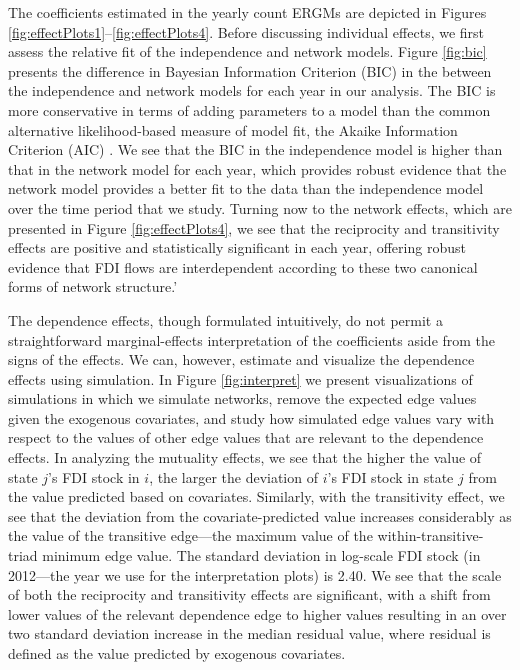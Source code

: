 \documentclass{article}
\begin{document}
The coefficients estimated in the yearly count ERGMs are depicted in Figures \ref{fig:effectPlots1}--\ref{fig:effectPlots4}. Before discussing individual effects, we first assess the relative fit of the independence and network models. Figure \ref{fig:bic} presents the difference in Bayesian Information Criterion (BIC) in the between the independence and network models for each year in our analysis. The BIC is more conservative in terms of adding parameters to a model than the common alternative likelihood-based measure of model fit, the Akaike Information Criterion (AIC) \citep{waldorp2005model,abrahamowicz1990optimal,raftery1999bayes}. We see that the BIC in the independence model is higher than that in the network model for each year, which provides robust evidence that the network model provides a better fit to the data than the independence model over the time period that we study. Turning now to the network effects, which are presented in Figure \ref{fig:effectPlots4}, we see that the reciprocity and transitivity effects are positive and statistically significant in each year, offering robust evidence that FDI flows are interdependent according to these two canonical forms of network structure.'

The dependence effects, though formulated intuitively, do not permit a straightforward marginal-effects interpretation of the coefficients aside from the signs of the effects. We can, however, estimate and visualize the dependence effects using simulation. In Figure \ref{fig:interpret} we present visualizations of simulations in which we simulate networks, remove the expected edge values given the exogenous covariates, and study how simulated edge values vary with respect to the values of other edge values that are relevant to the dependence effects. In analyzing the mutuality effects, we see that the higher the value of state $j$'s FDI stock in $i$, the larger the deviation of $i$'s FDI stock in state $j$ from the value predicted based on covariates. Similarly, with the transitivity effect, we see that the deviation from the covariate-predicted value increases considerably as the value of the transitive edge---the maximum value of the within-transitive-triad minimum edge value. The standard deviation in log-scale FDI stock (in 2012---the year we use for the interpretation plots) is 2.40.  We see that the scale of both the reciprocity and transitivity effects are significant, with a shift from lower values of the relevant dependence edge to higher values resulting in an over two standard deviation increase in the median residual value, where residual is defined as the value predicted by exogenous covariates.
\end{document}
